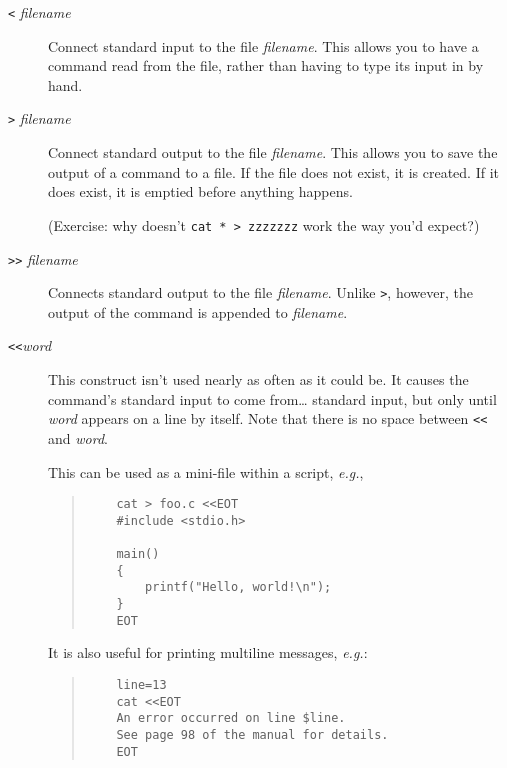 \documentclass{article}
\newcommand{\code}[1]{\texttt{#1}}
\begin{document}
\begin{description}
\item[\code{<} \textit{filename}]
	Connect standard input to the file \textit{filename}. This
	allows you to have a command read from the file, rather than
	having to type its input in by hand.
\item[\code{>} \textit{filename}]
	Connect standard output to the file \textit{filename}. This
	allows you to save the output of a command to a file. If the
	file does not exist, it is created. If it does exist, it is
	emptied before anything happens.

	(Exercise: why doesn't \code{cat * > zzzzzzz} work the way
	you'd expect?)
\item[\code{>>} \textit{filename}]
	Connects standard output to the file \textit{filename}. Unlike
	\code{>}, however, the output of the command is appended to
	\textit{filename}.
\item[\code{<<}\textit{word}]
	This construct isn't used nearly as often as it could be. It
	causes the command's standard input to come from\ldots
	standard input, but only until \textit{word} appears on a line
	by itself. Note that there is no space between \code{<<} and
	\textit{word}.

	This can be used as a mini-file within a script,
	\textit{e.g.},
	\begin{quote}
	\begin{verbatim}
	cat > foo.c <<EOT
	#include <stdio.h>

	main()
	{
		printf("Hello, world!\n");
	}
	EOT
	\end{verbatim}
	\end{quote}

	It is also useful for printing multiline messages,
	\textit{e.g.}:
	\begin{quote}
	\begin{verbatim}
	line=13
	cat <<EOT
	An error occurred on line $line.
	See page 98 of the manual for details.
	EOT
	\end{verbatim}%
	\end{quote}


\end{description}
\end{document}
